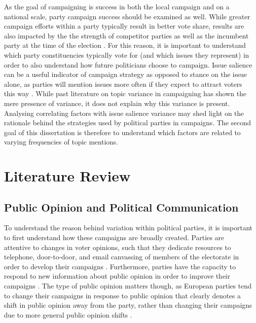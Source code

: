 \documentclass[preprint]{elsarticle} %
\begin{document}
As the goal of campaigning is success in both the local campaign and on a national scale, party campaign success should be examined as well. While greater campaign efforts within a party typically result in better vote share, results are also impacted by the the strength of competitor parties as well as the incumbent party at the time of the election \citep{pattieIncumbentPartiesIncumbent2017a}. For this reason, it is important to understand which party constituencies typically vote for (and which issues they represent) in order to also understand how future politicians choose to campaign. Issue salience can be a useful indicator of campaign strategy as opposed to stance on the issue alone, as parties will mention issues more often if they expect to attract voters this way \citep{pogorelisIssueSalienceRegional2005}. While past literature on topic variance in campaigning has shown the mere presence of variance, it does not explain why this variance is present. Analysing correlating factors with issue salience variance may shed light on the rationale behind the strategies used by political parties in campaigns. The second goal of this dissertation is therefore to understand which factors are related to varying frequencies of topic mentions. 



\section{Literature Review}

\subsection{Public Opinion and Political Communication}

To understand the reason behind variation within political parties, it is important to first understand how these campaigns are broadly created. Parties are attentive to changes in voter opinions, such that they dedicate resources to telephone, door-to-door, and email canvassing of members of the electorate in order to develop their campaigns \citep{fisherFootsloggingCallCentres2008}. Furthermore, parties have the capacity to respond to new information about public opinion in order to improve their campaigns \citep{hartmanLearningJobAdapting2017}. The type of public opinion matters though, as European parties tend to change their campaigns in response to public opinion that clearly denotes a shift in public opinion away from the party, rather than changing their campaigns due to more general public opinion shifts \citep{adamsUnderstandingChangeStability2004}. 
\end{document}
